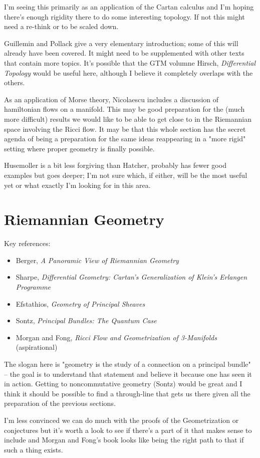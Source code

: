 \documentclass[article]{article}
\begin{document}
I'm seeing this primarily as an application of the Cartan calculus and I'm hoping there's enough rigidity there to do some interesting topology. If not this might need a re-think or to be scaled down.

Guillemin and Pollack give a very elementary introduction; some of this will already have been covered. It might need to be supplemented with other texts that contain more topics. It's possible that the GTM volumne Hirsch, \textit{Differential Topology} would be useful here, although I believe it completely overlaps with the others.

As an application of Morse theory, Nicolaescu includes a discussion of hamiltonian flows on a manifold. This may be good preparation for the (much more difficult) results we would like to be able to get close to in the Riemannian space involving the Ricci flow. It may be that this whole section has the secret agenda of being a preparation for the same ideas reappearing in a "more rigid" setting where proper geometry is finally possible.

Husemoller is a bit less forgiving than Hatcher, probably has fewer good examples but goes deeper; I'm not sure which, if either, will be the most useful yet or what exactly I'm looking for in this area.

\section{Riemannian Geometry}

Key references:
\begin{itemize}
	\item{Berger, \textit{A Panoramic View of Riemannian Geometry}}
	\item{Sharpe, \textit{Differential Geometry: Cartan’s Generalization of Klein’s Erlangen Programme}}
	\item{Efstathios, \textit{Geometry of Principal Sheaves}}
	\item{Sontz, \textit{Principal Bundles: The Quantum Case}}
	\item{Morgan and Fong, \textit{Ricci Flow and Geometrization of 3-Manifolds} (aspirational)}
\end{itemize}

The slogan here is "geometry is the study of a connection on a principal bundle" -- the goal is to understand that statement and believe it because one has seen it in action. Getting to noncommutative geometry (Sontz) would be great and I think it should be possible to find a through-line that gets us there given all the preparation of the previous sections. 

I'm less convinced we can do much with the proofs of the Geometrization or \Poincare conjectures but it's worth a look to see if there's a part of it that makes sense to include and Morgan and Fong's book looks like being the right path to that if such a thing exists.
\end{document}
